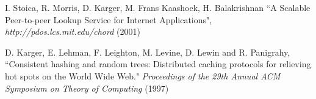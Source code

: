\documentclass{sig-alternate-10pt}
\begin{document}


%
\vspace{-0.1cm}

\begin{thebibliography}{00}
\vspace{-0.1cm}

I. Stoica, R. Morris, D. Karger, M. Frans Kaashoek, H. Balakrishnan
``A Scalable Peer-to-peer Lookup Service for Internet Applications",
{\em http://pdos.lcs.mit.edu/chord} (2001)

D. Karger, E. Lehman, F. Leighton, M. Levine, D. Lewin and R. Panigrahy,
``Consistent hashing and random trees: Distributed caching protocols for relieving hot spots on the World Wide Web."
{\em Proceedings of the 29th Annual ACM Symposium on Theory of Computing} (1997)

%
%
\end{thebibliography}
\end{document}
